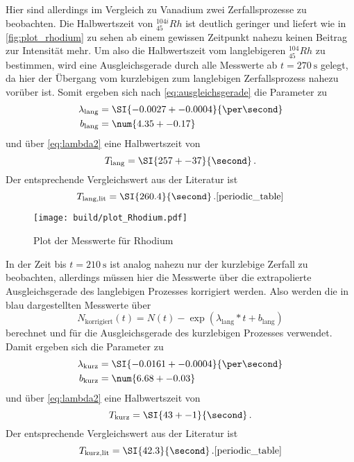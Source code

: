 Hier sind allerdings im Vergleich zu Vanadium zwei Zerfallsprozesse zu beobachten. 
Die Halbwertszeit von $ ^{104i}_{45}Rh$ ist deutlich geringer und liefert wie in \autoref{fig:plot_rhodium} zu sehen ab einem gewissen Zeitpunkt nahezu keinen Beitrag zur Intensität mehr.
Um also die Halbwertszeit vom langlebigeren $ ^{104}_{45}Rh$ zu bestimmen, wird eine Ausgleichsgerade durch alle Messwerte ab $t=\SI{270}{\second}$ gelegt, da hier der Übergang vom kurzlebigen zum langlebigen Zerfallsprozess nahezu vorüber ist.
Somit ergeben sich nach \autoref{eq:ausgleichsgerade} die Parameter zu 
\begin{align*}
    \lambda_\text{lang} &= \SI{-0.0027+-0.0004}{\per\second} \\
    b_\text{lang} &= \num{4.35+-0.17}
\end{align*}
und über \autoref{eq:lambda2} eine Halbwertszeit von 
\begin{equation*}
    T_\text{lang} = \SI{257+-37}{\second} \, .
\end{equation*}
Der entsprechende Vergleichswert aus der Literatur ist 
\begin{equation*}
    T_\text{lang,lit} = \SI{260.4}{\second} \, .\text{\cite{periodic_table}}
\end{equation*}

\begin{figure}
    \centering
    \texttt{[image: build/plot\_Rhodium.pdf]}
    \caption{Plot der Messwerte für Rhodium}
    \label{fig:plot_rhodium}
\end{figure}

In der Zeit bis $t=\SI{210}{\second}$ ist analog nahezu nur der kurzlebige Zerfall zu beobachten, allerdings müssen hier die Messwerte über die extrapolierte Ausgleichsgerade des langlebigen Prozesses korrigiert werden.
Also werden die in blau dargestellten Messwerte über
\begin{equation}
    N_\text{korrigiert}(t) = N(t) - \exp(\lambda_\text{lang} * t + b_\text{lang})
\end{equation}
berechnet und für die Ausgleichsgerade des kurzlebigen Prozesses verwendet.
Damit ergeben sich die Parameter zu
\begin{align*}
    \lambda_\text{kurz} &= \SI{-0.0161+-0.0004}{\per\second} \\
    b_\text{kurz} &= \num{6.68+-0.03}
\end{align*}
und über \autoref{eq:lambda2} eine Halbwertszeit von 
\begin{equation*}
    T_\text{kurz} = \SI{43+-1}{\second} \, .
\end{equation*}
Der entsprechende Vergleichswert aus der Literatur ist 
\begin{equation*}
    T_\text{kurz,lit} = \SI{42.3}{\second} \, .\text{\cite{periodic_table}}
\end{equation*}

